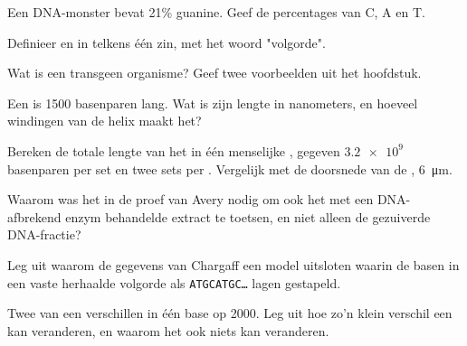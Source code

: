\begin{exercise}[$\star$]\label{exo:g10:universal-dna:3}
Een DNA-monster bevat 21\% guanine. Geef de percentages van C, A en T.
\end{exercise}

\begin{exercise}[$\star$]\label{exo:g10:universal-dna:4}
Definieer  en  in telkens één zin, met het woord "volgorde".
\end{exercise}

\begin{exercise}[$\star$]\label{exo:g10:universal-dna:5}
Wat is een transgeen organisme? Geef twee voorbeelden uit het hoofdstuk.
\end{exercise}

\begin{exercise}[$\star\star$]\label{exo:g10:universal-dna:6}
Een  is 1500 basenparen lang. Wat is zijn lengte in nanometers, en
hoeveel windingen van de helix maakt het?
\end{exercise}

\begin{exercise}[$\star\star$]\label{exo:g10:universal-dna:7}
Bereken de totale lengte van het  in één menselijke , gegeven
$\num{3.2e9}$ basenparen per set  en twee sets per .
Vergelijk met de doorsnede van de , \qty{6}{\micro m}.
\end{exercise}

\begin{exercise}[$\star\star$]\label{exo:g10:universal-dna:8}
Waarom was het in de proef van Avery nodig om ook het met een
DNA-afbrekend enzym behandelde extract te toetsen, en niet alleen de
gezuiverde DNA-fractie?
\end{exercise}

\begin{exercise}[$\star\star$]\label{exo:g10:universal-dna:9}
Leg uit waarom de gegevens van Chargaff een model uitsloten waarin de
basen in een vaste herhaalde volgorde als \texttt{ATGCATGC\dots} lagen
gestapeld.
\end{exercise}

\begin{exercise}[$\star\star$]\label{exo:g10:universal-dna:10}
Twee  van een  verschillen in één base op 2000. Leg uit hoe
zo'n klein verschil een  kan veranderen, en waarom het ook niets
kan veranderen.
\end{exercise}

